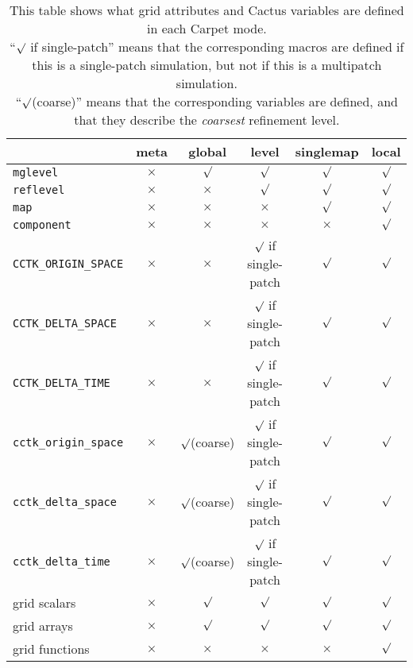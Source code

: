 \documentclass{article}
\begin{document}
\begin{table}[bp]
\def\yes{$\surd$}
\def\no{$\times$}
\begin{center}
\begin{tabular}{|lccccc|}
\hline %
				&meta	&global	&level	&singlemap
								&local	\\
\hline %
\texttt{mglevel}		&\no	&\yes	&\yes	&\yes	&\yes	\\
\texttt{reflevel}		&\no	&\no	&\yes	&\yes	&\yes	\\
\texttt{map}			&\no	&\no	&\no	&\yes	&\yes	\\
\texttt{component}		&\no	&\no	&\no	&\no	&\yes	\\
\hline %
\texttt{CCTK\_ORIGIN\_SPACE}	&\no	&\no	&\yes{} if single-patch
							&\yes	&\yes	\\
\texttt{CCTK\_DELTA\_SPACE}	&\no	&\no	&\yes{} if single-patch
							&\yes	&\yes	\\
\texttt{CCTK\_DELTA\_TIME}	&\no	&\no	&\yes{} if single-patch
							&\yes	&\yes	\\
\texttt{cctk\_origin\_space}	&\no	&\yes (coarse)
						&\yes{} if single-patch
							&\yes	&\yes	\\
\texttt{cctk\_delta\_space}	&\no	&\yes (coarse)
						&\yes{} if single-patch
							&\yes	&\yes	\\
\texttt{cctk\_delta\_time}	&\no	&\yes (coarse)
						&\yes{} if single-patch
							&\yes	&\yes	\\
\hline %
grid scalars			&\no	&\yes	&\yes	&\yes	&\yes	\\
grid arrays			&\no	&\yes	&\yes	&\yes	&\yes	\\
grid functions			&\no	&\no	&\no	&\no	&\yes	\\
\hline %
\end{tabular}
\end{center}
\caption[What Carpet Defines in Each Mode]
	{
	This table shows what grid attributes and Cactus variables
	are defined in each Carpet mode.				\\
	``\yes{} if single-patch'' means that the corresponding macros
	are defined if this is a single-patch simulation, but not if
	this is a multipatch simulation.				\\
	``\yes (coarse)'' means that the corresponding variables are
	defined, and that they describe the \emph{coarsest} refinement
	level.								%
	}
\label{tab-what-Carpet-defines-in-each-mode}
\end{table}
\end{document}
